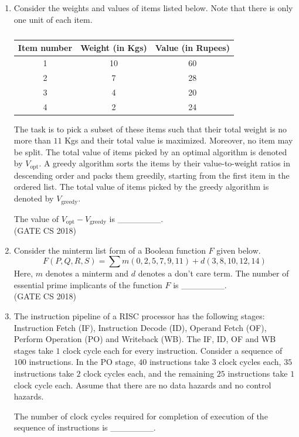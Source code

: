 \documentclass[12pt]{article}
\begin{document}
\begin{enumerate}
\item Consider the weights and values of items listed below. Note that there is only one unit of each item.

\begin{table}[H]
\centering
\caption{} \label{} 
\begin{tabular}{|c|c|c|}
\hline
\textbf{Item number} & \textbf{Weight (in Kgs)} & \textbf{Value (in Rupees)}\\
\hline
1 & 10 & 60\\
2 & 7 & 28\\
3 & 4 & 20\\
4 & 2 & 24\\
\hline
\end{tabular}
\end{table}

The task is to pick a subset of these items such that their total weight is no more than $11$ Kgs and their total value is maximized. Moreover, no item may be split. The total value of items picked by an optimal algorithm is denoted by $V_{\text{opt}}$. A greedy algorithm sorts the items by their value-to-weight ratios in descending order and packs them greedily, starting from the first item in the ordered list. The total value of items picked by the greedy algorithm is denoted by $V_{\text{greedy}}$.

The value of $V_{\text{opt}}-V_{\text{greedy}}$ is \_\_\_\_\_\_\_.\\
(GATE CS 2018)

\item Consider the minterm list form of a Boolean function $F$ given below.
$$
F(P,Q,R,S)=\sum m(0,2,5,7,9,11)+d(3,8,10,12,14)
$$
Here, $m$ denotes a minterm and $d$ denotes a don’t care term. The number of essential prime implicants of the function $F$ is \_\_\_\_\_\_\_.\\
(GATE CS 2018)

\item The instruction pipeline of a RISC processor has the following stages: Instruction Fetch (IF), Instruction Decode (ID), Operand Fetch (OF), Perform Operation (PO) and Writeback (WB). The IF, ID, OF and WB stages take $1$ clock cycle each for every instruction. Consider a sequence of $100$ instructions. In the PO stage, $40$ instructions take $3$ clock cycles each, $35$ instructions take $2$ clock cycles each, and the remaining $25$ instructions take $1$ clock cycle each. Assume that there are no data hazards and no control hazards.

The number of clock cycles required for completion of execution of the sequence of instructions is \_\_\_\_\_\_\_.


\end{enumerate}
\end{document}
